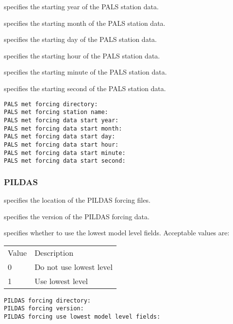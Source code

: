   specifies the starting
 year of the PALS station data.

  specifies the starting
 month of the PALS station data.

  specifies the starting
 day of the PALS station data.

  specifies the starting
 hour of the PALS station data.

  specifies the starting
 minute of the PALS station data.

  specifies the starting
 second of the PALS station data.
 

 \begin{Verbatim}[frame=single]
PALS met forcing directory:
PALS met forcing station name:
PALS met forcing data start year:
PALS met forcing data start month:
PALS met forcing data start day:
PALS met forcing data start hour:
PALS met forcing data start minute:
PALS met forcing data start second:
 \end{Verbatim}

 
 \subsubsection{PILDAS} \label{sssec:pildas}
 

 
  specifies the location of the
 PILDAS forcing files.

  specifies the version of the
 PILDAS forcing data.

  specifies
 whether to use the lowest model level fields.
 Acceptable values are:

 \begin{tabular}{ll}
 Value & Description             \\
  0    & Do not use lowest level \\
  1    & Use lowest level        \\
 \end{tabular}
 

 \begin{Verbatim}[frame=single]
PILDAS forcing directory:
PILDAS forcing version:
PILDAS forcing use lowest model level fields:
 \end{Verbatim}

